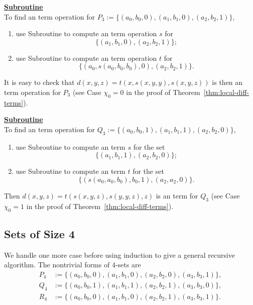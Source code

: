 \medskip

\noindent \underline{\textbf{Subroutine }}\\[4pt]
To find an \ld term operation for
$P_3:=\{(a_0, b_0, 0), (a_1, b_1, 0),  (a_2, b_2, 1)\}$,
\begin{enumerate}
\item use Subroutine  to compute an \ld term operation $s$ for
\begin{equation*}
\{(a_1, b_1, 0), (a_2, b_2, 1)\}; 
\end{equation*}
\item use Subroutine  to compute an \ld term operation $t$ for
\begin{equation*}
\{(a_0, s(a_0, b_0, b_0), 0), (a_2, b_2, 1)\}.
\end{equation*}
\end{enumerate}
It is easy to check that
$d(x,y,z) = t(x, s(x,y,y), s(x,y,z))$
is then an \ld term operation for $P_3$ 
(see Case $\chi_0=0$ in the proof of Theorem~\ref{thm:local-diff-terms}).

\medskip

\noindent \underline{\textbf{Subroutine }}\\[4pt]
To find an \ld term operation for 
$Q_3 := \{(a_0, b_0, 1), (a_1, b_1, 1), (a_2, b_2, 0)\}$,
\begin{enumerate}
\item \label{item:001-1}
use Subroutine  to compute an \ld term $s$ for the set
\begin{equation*}
\{(a_1, b_1, 1), (a_2, b_2, 0)\};
\end{equation*}
\item \label{item:001-2} use Subroutine  to compute an \ld term $t$
for the set
\begin{equation*}
\{(s(a_0, a_0, b_0), b_0, 1),  (a_2,a_2,0)\}.
\end{equation*}
\end{enumerate}
Then 
$d(x,y,z) = t(s(x,y,z), s(y,y,z),z)$
is an \ld term  for $Q_3$ (see Case $\chi_0=1$ in the proof of Theorem~\ref{thm:local-diff-terms}).

\subsection{Sets of Size 4} We handle one more case before 
using induction to give a general recursive algorithm.
The nontrivial forms of 4-sets are
\begin{align*}
P_4 &:= \{(a_0, b_0, 0), (a_1, b_1, 0),  (a_2, b_2, 0),  (a_3, b_3, 1)\},\\ 
Q_4 &:= \{(a_0, b_0, 1), (a_1, b_1, 1), (a_2, b_2, 1), (a_3, b_3, 0)\},\\
R_4 &:= \{(a_0, b_0, 0), (a_1, b_1, 0),  (a_2, b_2, 1),  (a_3, b_3, 1)\}.
\end{align*}

